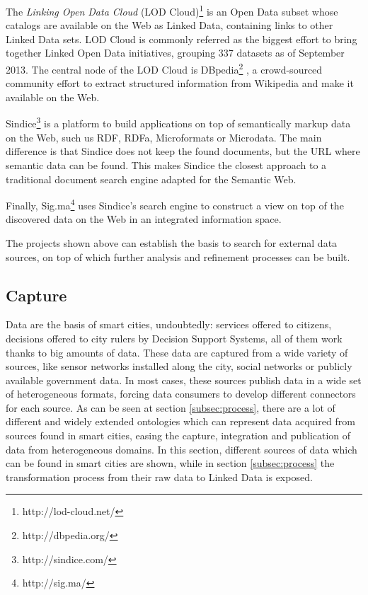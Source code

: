 The \textit{Linking Open Data Cloud} (LOD Cloud)\footnote{http://lod-cloud.net/} is an Open Data subset whose catalogs are available on the Web as Linked Data, containing links to other Linked Data sets. LOD Cloud is commonly referred as the biggest effort to bring together Linked Open Data initiatives, grouping 337 datasets as of September 2013. The central node of the LOD Cloud is DBpedia\footnote{http://dbpedia.org/} \cite{auer2007dbpedia, bizer2009dbpedia}, a crowd-sourced community effort to extract structured information from Wikipedia and make it available on the Web.

Sindice\footnote{http://sindice.com/} \cite{tummarello2007sindice} is a platform to build applications on top of semantically markup data on the Web, such us RDF, RDFa, Microformats or Microdata. The main difference is that Sindice does not keep the found documents, but the URL where semantic data can be found. This makes Sindice the closest approach to a traditional document search engine adapted for the Semantic Web.

Finally, Sig.ma\footnote{http://sig.ma/} \cite{tummarello2010sig} uses Sindice's search engine to construct a view on top of the discovered data on the Web in an integrated information space.

The projects shown above can establish the basis to search for external data sources, on top of which further analysis and refinement processes can be built.

\subsection{Capture}
\label{sec:capture}

Data are the basis of smart cities, undoubtedly: services offered to citizens, decisions offered to city rulers by Decision Support Systems, all of them work thanks to big amounts of data. These data are captured from a wide variety of sources, like sensor networks installed along the city, social networks or publicly available government data. In most cases, these sources publish data in a wide set of heterogeneous formats, forcing data consumers to develop different connectors for each source. As can be seen at section \ref{subsec:process}, there are a lot of different and widely extended ontologies which can represent data acquired from sources found in smart cities, easing the capture, integration and publication of data from heterogeneous domains. In this section, different sources of data which can be found in smart cities are shown, while in section \ref{subsec:process} the transformation process from their raw data to Linked Data is exposed.

